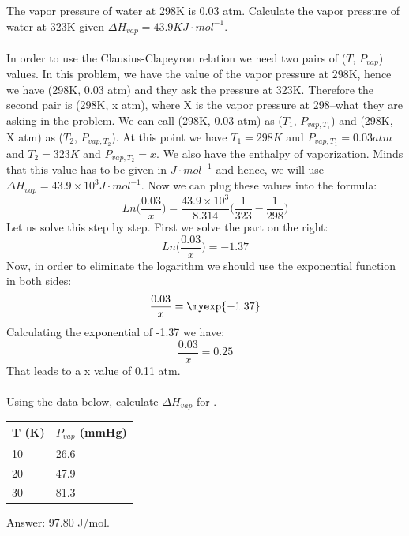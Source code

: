 \documentclass[main.tex]{subfiles}
\begin{document}
\begin{description}
\begin{example} %
The vapor pressure of water at 298K is 0.03 atm. Calculate the vapor pressure of water at 323K given $\Delta H_{vap}=43.9 KJ\cdot mol^{-1}$.
\\
\\
In order to use the Clausius-Clapeyron relation we need two pairs of ($T$, $P_{vap}$) values. In this problem, we have the value of the vapor pressure at 298K, hence we have (298K, 0.03 atm) and they ask the pressure at 323K. Therefore the second pair is  (298K, x atm), where X is the vapor pressure at 298--what they are asking in the problem. We can call (298K, 0.03 atm) as ($T_1$, $P_{vap, T_1}$) and (298K, X atm) as ($T_2$, $P_{vap, T_2}$). At this point we have $T_1=298K$ and $P_{vap, T_1}=0.03 atm$ and $T_2=323K$ and $P_{vap, T_2}=x$. We also have the enthalpy of vaporization. Minds that this value has to be given in $J\cdot mol^{-1}$ and hence, we will use $\Delta H_{vap}=43.9\times 10^3J\cdot mol^{-1}$. Now we can plug these values into the formula:
\begin{equation*}
Ln\Bigg(\frac{0.03 }{x}\Bigg)=\frac{43.9\times 10^3}{8.314}\Bigg(\frac{1}{323}-\frac{1}{298}\Bigg)  
\end{equation*}
Let us solve this step by step. First we solve the part on the right:
\begin{equation*}
Ln\Bigg(\frac{0.03} {x}\Bigg)=-1.37
\end{equation*}
Now, in order to eliminate the logarithm we should use the exponential function in both sides:
\begin{equation*}\frac{0.03} {x}=\myexp{-1.37}\end{equation*}
Calculating the exponential of -1.37 we have:
\begin{equation*}\frac{0.03} {x}=0.25\end{equation*}
That leads to a x value of 0.11 atm.
\\
\faDiamond\ \\
Using the data below, calculate $\Delta H_{vap}$ for .\\
\begin{tabularx}{\textwidth}{YY}
  \toprule
 T (K)& $P_{vap}$ (mmHg)   \\
     & 	 26.6		   \\
    20 & 	 47.9		   \\
      30 & 	81.3		   \\
    \bottomrule
\end{tabularx}
\begin{flushright} Answer: 97.80 J/mol.   \end{flushright}
\end{example}%

\end{description}
\end{document}
